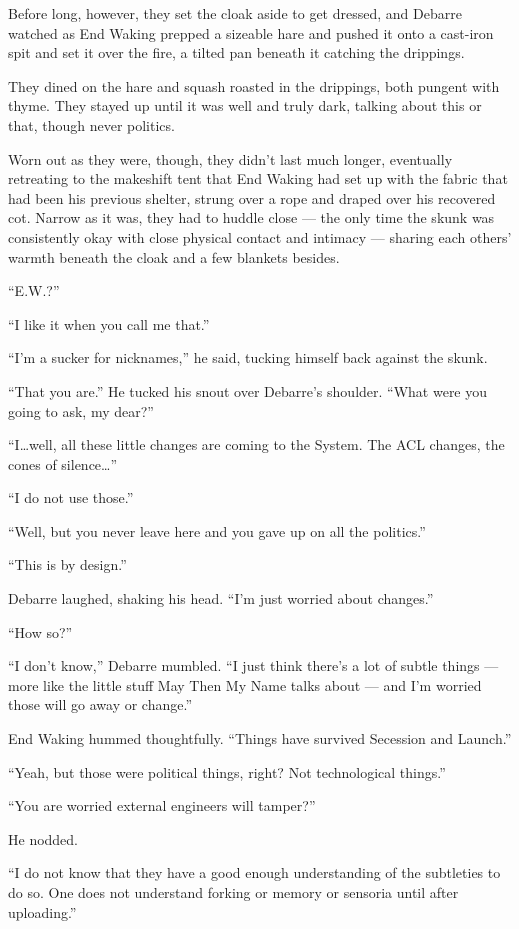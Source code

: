 Before long, however, they set the cloak aside to get dressed, and Debarre watched as End Waking prepped a sizeable hare and pushed it onto a cast-iron spit and set it over the fire, a tilted pan beneath it catching the drippings.

They dined on the hare and squash roasted in the drippings, both pungent with thyme. They stayed up until it was well and truly dark, talking about this or that, though never politics.

Worn out as they were, though, they didn't last much longer, eventually retreating to the makeshift tent that End Waking had set up with the fabric that had been his previous shelter, strung over a rope and draped over his recovered cot. Narrow as it was, they had to huddle close — the only time the skunk was consistently okay with close physical contact and intimacy — sharing each others' warmth beneath the cloak and a few blankets besides.

``E.W.?''

``I like it when you call me that.''

``I'm a sucker for nicknames,'' he said, tucking himself back against the skunk.

``That you are.'' He tucked his snout over Debarre's shoulder. ``What were you going to ask, my dear?''

``I\ldots well, all these little changes are coming to the System. The ACL changes, the cones of silence\ldots{}''

``I do not use those.''

``Well, but you never leave here and you gave up on all the politics.''

``This is by design.''

Debarre laughed, shaking his head. ``I'm just worried about changes.''

``How so?''

``I don't know,'' Debarre mumbled. ``I just think there's a lot of subtle things — more like the little stuff May Then My Name talks about — and I'm worried those will go away or change.''

End Waking hummed thoughtfully. ``Things have survived Secession and Launch.''

``Yeah, but those were political things, right? Not technological things.''

``You are worried external engineers will tamper?''

He nodded.

``I do not know that they have a good enough understanding of the subtleties to do so. One does not understand forking or memory or sensoria until after uploading.''

